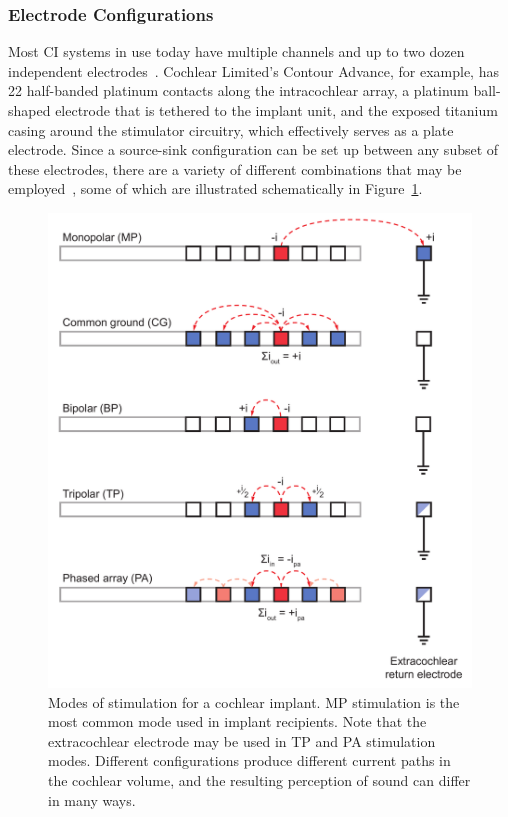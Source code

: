 \subsubsection{Electrode Configurations}
\label{sect:electrode_configs}

Most CI systems in use today have multiple channels and up to two dozen
independent electrodes~\cite{clark2006}. Cochlear Limited's Contour Advance, for
example, has 22 half-banded platinum contacts along the intracochlear array, a
platinum ball-shaped electrode that is tethered to the implant unit, and the
exposed titanium casing around the stimulator circuitry, which effectively
serves as a plate electrode. Since a source-sink configuration can be set up
between any subset of these electrodes, there are a variety of different
combinations that may be employed~\cite{busby1994}, some of which are
illustrated schematically in Figure~\ref{fig:stim_modes}.

\begin{figure}
	\centering
	\includegraphics[width=12.8cm]{Background/electrode_config.pdf}
	\caption[Modes of stimulation]{Modes of stimulation for a cochlear implant.
	MP stimulation is the most common mode used in implant recipients. Note that
	the extracochlear electrode may be used in TP and PA stimulation modes.
	Different configurations produce different current paths in the cochlear
	volume, and the resulting perception of sound can differ in many ways.}
	\label{fig:stim_modes}
\end{figure}

